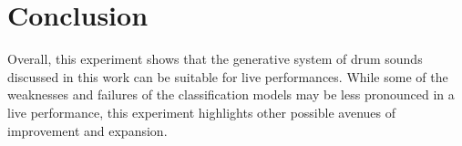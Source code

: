 \documentclass[\main/thesis.tex]{subfiles}
\begin{document}
\section{Conclusion}
Overall, this experiment shows that the generative system of drum sounds discussed in this work can be suitable for live performances. While some of the weaknesses and failures of the classification models may be less pronounced in a live performance, this experiment highlights other possible avenues of improvement and expansion. 
\end{document}

